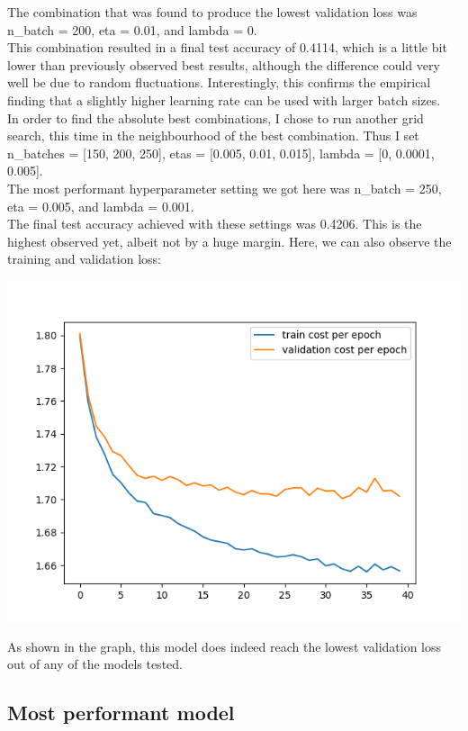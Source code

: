 \documentclass[11pt,a4paper]{article}
\begin{document}
The combination that was found to produce the lowest validation loss was n\_batch = 200, eta = 0.01, and lambda = 0.\\

This combination resulted in a final test accuracy of 0.4114, which is a little bit lower than previously observed best results, although the difference could very well be due to random fluctuations. Interestingly, this confirms the empirical finding that a slightly higher learning rate can be used with larger batch sizes.\\

In order to find the absolute best combinations, I chose to run another grid search, this time in the neighbourhood of the best combination. Thus I set n\_batches = [150, 200, 250], etas = [0.005, 0.01, 0.015], lambda = [0, 0.0001, 0.005].\\

The most performant hyperparameter setting we got here was n\_batch = 250, eta = 0.005, and lambda = 0.001.\\

The final test accuracy achieved with these settings was 0.4206. This is the highest observed yet, albeit not by a huge margin. Here, we can also observe the training and validation loss:

\includegraphics[width=\textwidth]{grid_searched_settings.png}

As shown in the graph, this model does indeed reach the lowest validation loss out of any of the models tested.\\

\subsection{Most performant model}
\end{document}
